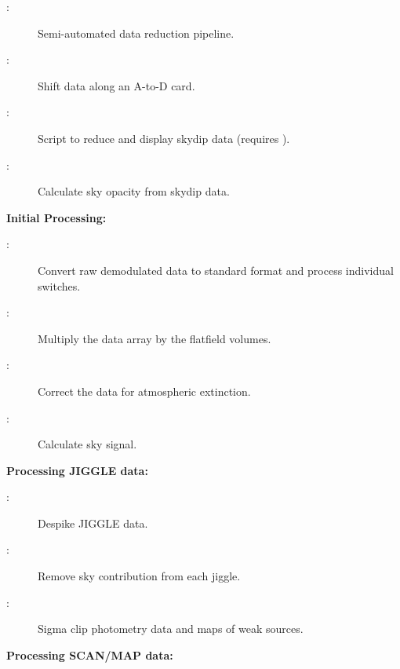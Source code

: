 \documentclass[twoside,11pt]{starlink}
\providecommand{\Kappa}{\xref{{\textsc{Kappa}}}{sun95}{}}
\begin{document}
\begin{description}
\begin{description}
\item[:] Semi-automated data reduction pipeline.

\item[:] Shift data along an A-to-D card.

\item[:] Script to reduce and display skydip data
(requires \Kappa).

\item[:] Calculate sky opacity from skydip data.

\end{description}

\item \textbf{Initial Processing:}

\begin{description}

\item[:] Convert raw demodulated data
to standard format and process individual switches.

\item[:] Multiply the data array by the
flatfield volumes.

\item[:] Correct the data for atmospheric
extinction.

\item[:] Calculate sky signal.

\end{description}

\item \textbf{Processing JIGGLE data:}

\begin{description}

\item[:] Despike JIGGLE data.

\item[:] Remove sky contribution from each jiggle.

\item[:] Sigma clip photometry data and maps of
weak sources.

\end{description}

\item \textbf{Processing SCAN/MAP data:}


\end{description}
\end{document}
